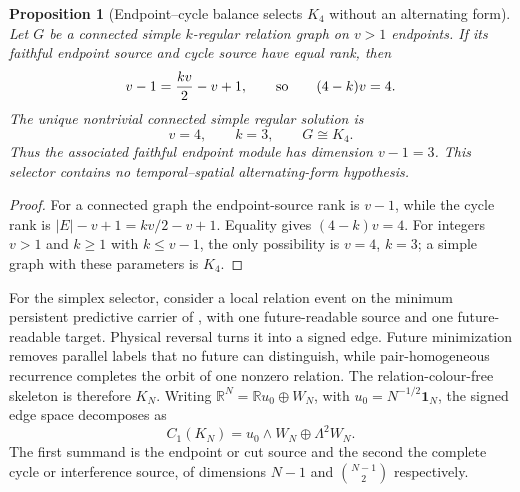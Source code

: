 \documentclass[11pt]{article}
\numberwithin{equation}{section}
\newtheorem{proposition}[proposition]{Proposition}
\theoremstyle{definition}
\theoremstyle{remark}
\newcommand{\R}{\mathbb R}
\newcommand{\one}{\mathbf 1}
\begin{document}
\begin{proposition}[Endpoint--cycle balance selects $K_4$ without an alternating form]
\label{prop:main-regular-graph-k4}
Let $G$ be a connected simple $k$-regular relation graph on $v>1$ endpoints.
If its faithful endpoint source and cycle source have equal rank, then
\begin{equation}
 v-1=\frac{kv}{2}-v+1,
 \qquad\hbox{so}\qquad
 (4-k)v=4.
 \label{eq:main-regular-graph-balance}
\end{equation}
The unique nontrivial connected simple regular solution is
\begin{equation}
 v=4,\qquad k=3,\qquad G\cong K_4.
 \label{eq:main-regular-graph-k4}
\end{equation}
Thus the associated faithful endpoint module has dimension $v-1=3$.  This
selector contains no temporal--spatial alternating-form hypothesis.
\end{proposition}

\begin{proof}
For a connected graph the endpoint-source rank is $v-1$, while the cycle
rank is $|E|-v+1=kv/2-v+1$. Equality gives $(4-k)v=4$.
For integers $v>1$ and $k\ge1$ with $k\le v-1$, the only possibility
is $v=4$, $k=3$; a simple graph with these parameters is $K_4$.
\end{proof}

For the simplex selector, consider a local relation event on the minimum
persistent predictive carrier of , with one
future-readable source and one future-readable target.  Physical reversal
turns it into a signed edge.  Future minimization removes parallel labels that
no future can distinguish, while pair-homogeneous recurrence completes the
orbit of one nonzero relation.  The relation-colour-free skeleton is therefore
$K_N$.  Writing $\R^N=\R u_0\oplus W_N$, with
$u_0=N^{-1/2}\one_N$, the signed edge space decomposes as
\begin{equation}
 C_1(K_N)=u_0\wedge W_N\oplus\Lambda^2W_N.
 \label{eq:cut-cycle-main}
\end{equation}
The first summand is the endpoint or cut source and the second the complete
cycle or interference source, of dimensions $N-1$ and
$\binom{N-1}{2}$ respectively.
\end{document}
